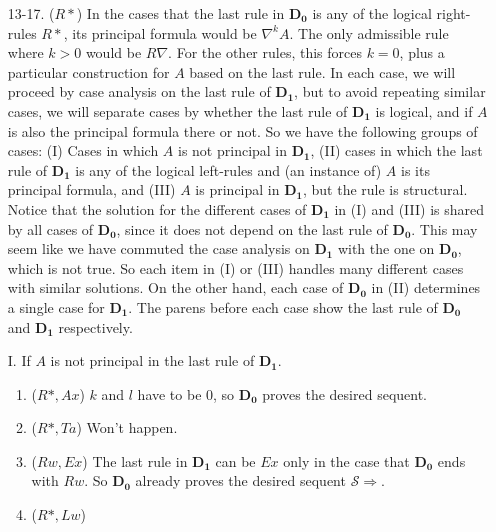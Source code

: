 \documentclass[a4paper, 12pt]{paper}
\begin{document}
\begin{enumerate}
	\item[13-17.] ($R*$) In the cases that the last rule in $\mathbf{D_0}$ is any of the logical right-rules $R*$, its principal formula would be $\nabla^k A$. The only admissible rule where $k > 0$ would be $R\nabla$. For the other rules, this forces $k = 0$, plus a particular construction for $A$ based on the last rule. In each case, we will proceed by case analysis on the last rule of $\mathbf{D_1}$, but to avoid repeating similar cases, we will separate cases by whether the last rule of $\mathbf{D_1}$ is logical, and if $A$ is also the principal formula there or not. So we have the following groups of cases:
	(I) Cases in which $A$ is not principal in $\mathbf{D_1}$,
	(II) cases in which the last rule of $\mathbf{D_1}$ is any of the logical left-rules and (an instance of) $A$ is its principal formula, and (III) $A$ is principal in $\mathbf{D_1}$, but the rule is structural. Notice that the solution for the different cases of $\mathbf{D_1}$ in (I) and (III) is shared by all cases of $\mathbf{D_0}$, since it does not depend on the last rule of $\mathbf{D_0}$. This may seem like we have commuted the case analysis on $\mathbf{D_1}$ with the one on $\mathbf{D_0}$, which is not true. So each item in (I) or (III) handles many different cases with similar solutions.
	On the other hand, each case of $\mathbf{D_0}$ in (II) determines a single case for $\mathbf{D_1}$. The parens before each case show the last rule of $\mathbf{D_0}$ and $\mathbf{D_1}$ respectively.


	I. If $A$ is not principal in the last rule of $\mathbf{D_1}$.
	
	\begin{enumerate}[label={\alph*.}]
		\item ($R*, Ax$) $k$ and $l$ have to be $0$, so $\mathbf{D_0}$ proves the desired sequent.
		
		\item ($R*, Ta$) Won't happen.
		
		\item ($Rw, Ex$) The last rule in $\mathbf{D_1}$ can be $Ex$ only in the case that $\mathbf{D_0}$ ends with $Rw$. So $\mathbf{D_0}$ already proves the desired sequent $\mathcal{S} \Rightarrow$.
		
		\item ($R*, Lw$)
		\begin{prooftree}
			\noLine
			
			\noLine
			

\end{prooftree}
\end{enumerate}
\end{enumerate}
\end{document}
